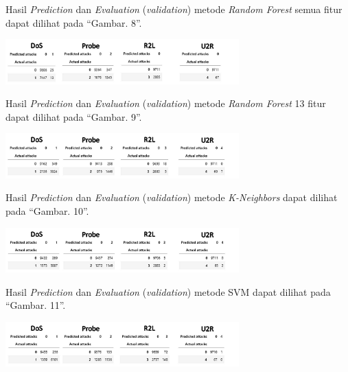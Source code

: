 \documentclass[conference]{IEEEtran}
\begin{document}
Hasil \emph{Prediction} dan \emph{Evaluation} (\emph{validation})
metode \emph{Random Forest} semua fitur dapat dilihat
pada ``Gambar. 8''.

\begin{minipage}{\linewidth}
\centerline{\includegraphics[width=90mm]{Gambar/Gbr006.jpg}}
\label{fig8}
\end{minipage}
\vspace{6pt}

Hasil \emph{Prediction} dan \emph{Evaluation} (\emph{validation})
metode \emph{Random Forest} 13 fitur dapat dilihat
pada ``Gambar. 9''.

\begin{minipage}{\linewidth}
\centerline{\includegraphics[width=90mm]{Gambar/Gbr007.jpg}}
\label{fig9}
\end{minipage}
\vspace{6pt}

Hasil \emph{Prediction} dan \emph{Evaluation} (\emph{validation})
metode \emph{K-Neighbors} dapat dilihat
pada ``Gambar. 10''.

\begin{minipage}{\linewidth}
\centerline{\includegraphics[width=90mm]{Gambar/Gbr008.jpg}}
\label{fig10}
\end{minipage}
\vspace{6pt}

Hasil \emph{Prediction} dan \emph{Evaluation} (\emph{validation})
metode SVM dapat dilihat
pada ``Gambar. 11''.

\begin{minipage}{\linewidth}
\centerline{\includegraphics[width=90mm]{Gambar/Gbr009.jpg}}
\label{fig11}
\end{minipage}
\vspace{6pt}
\end{document}
